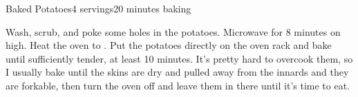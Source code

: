 \documentclass[../Cookbook.tex]{subfiles}
\begin{document}
\begin{recipe}[BakedPotato]{Baked Potatoes}{4 servings}{20 minutes baking}

  Wash, scrub, and poke some holes in the potatoes.
  Microwave for 8 minutes on high. Heat the oven to .
  Put the potatoes directly on the oven rack and bake until sufficiently tender, at least 10 minutes. It's pretty hard to overcook them, so I usually bake until the skins are dry and pulled away from the innards and they are forkable, then turn the oven off and leave them in there until it's time to eat.

\end{recipe}
\end{document}
